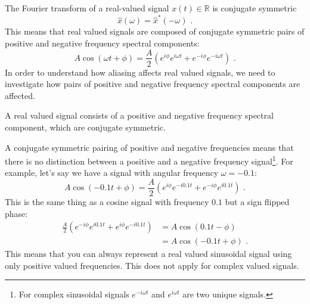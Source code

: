 The Fourier transform of a real-valued signal $x(t) \in \mathbb{R}$ is
conjugate symmetric
\begin{equation}
  \hat{x}(\omega) = \hat{x}^*(-\omega)\,\,.
\end{equation}
This means that real valued signals are composed of conjugate
symmetric pairs of positive and negative frequency spectral
components:
\begin{equation}
A \cos(\omega t + \phi) = \frac{A}{2}(e^{i\phi}e^{i\omega t} + e^{-i\phi}e^{-i\omega t})\,\,.
\end{equation}
In order to understand how aliasing affects real valued signals, we
 need to investigate how pairs of positive and negative frequency spectral components are affected.
\begin{marginfigure}
\begin{center}
\end{center}
\caption{A real valued signal consists of a positive and negative frequency spectral component, which are conjugate symmetric.}
\end{marginfigure}
A conjugate symmetric pairing of positive and negative frequencies means that there is no distinction between a positive and a negative frequency signal\footnote{For complex sinusoidal signals $e^{-i \omega t}$ and $e^{i \omega t}$ are two unique signals.}. For example, let's say we have a signal with angular frequency $\omega = -0.1$:
\begin{equation}
A \cos(-0.1 t + \phi) = \frac{A}{2}(e^{i\phi}e^{-i0.1  t} + e^{-i\phi}e^{i0.1 t})\,\,.
\end{equation}
This is the same thing as a cosine signal with frequency $0.1$ but a sign flipped phase:
\begin{align}
  \frac{A}{2}(e^{-i\phi}e^{i 0.1 t} + e^{i\phi}e^{-i 0.1 t}) &= A \cos(0.1 t - \phi)\\
  &= A \cos(-0.1 t + \phi)\,\,.
\end{align}
This means that you can always represent a real valued sinusoidal signal using only positive valued frequencies. This does not apply for complex valued signals.

